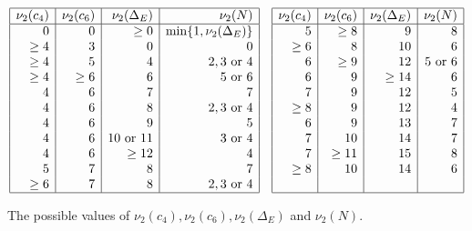 \documentclass[11pt]{report}
\theoremstyle{definition}
\begin{document}
\begin{table}[h]
$$
\begin{array}{|r|r|r|r|}
\hline
\nu_2 (c_4) & \nu_2 (c_6) & \nu_2 (\Delta_E) & \nu_2 (N)  \\ \hline
0 & 0 & \geq 0  & \min \{ 1, \nu_2 (\Delta_E)  \}  \\
\geq 4 &  3 & 0 & 0  \\
\geq 4 & 5 & 4 & 2, 3 \mbox{ or } 4  \\
\geq 4 & \geq 6 & 6 & 5 \mbox{ or } 6  \\
4 & 6 & 7 & 7  \\
4 & 6 & 8 & 2, 3 \mbox{ or } 4  \\
4 & 6 & 9 &  5   \\
4 & 6 & 10 \mbox{ or } 11 & 3 \mbox{ or } 4   \\
4 & 6 & \geq 12 &  4  \\
5 & 7 & 8 & 7  \\
\geq 6 & 7 & 8 & 2, 3 \mbox{ or } 4  \\
\hline
\end{array}
\quad
\begin{array}{|r|r|r|r|}
\hline
\nu_2 (c_4) & \nu_2 (c_6) & \nu_2 (\Delta_E) & \nu_2 (N)  \\ \hline
 5 & \geq 8 & 9 & 8 \\
  \geq 6 & 8 & 10 & 6 \\
 6 & \geq 9 & 12 & 5 \mbox{ or } 6 \\
 6 & 9 & \geq 14 &  6 \\
 7 & 9 & 12 & 5 \\
  \geq 8 & 9 & 12 & 4 \\
 6 & 9 & 13 & 7 \\
 7 & 10 & 14 & 7 \\
 7 & \geq 11 & 15 & 8 \\
  \geq 8 &  10 & 14 & 6 \\
  & & & \\
\hline
\end{array}
$$


\caption{The possible values of $\nu_2(c_4), \nu_2(c_6), \nu_2(\Delta_E)$ and $\nu_2(N)$.}
\label{tab nu2}
\end{table}
\end{document}
